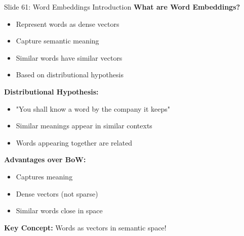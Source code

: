 \documentclass[8pt]{beamer}
\begin{document}
	\begin{frame}{Slide 61: Word Embeddings Introduction}
		\fontsize{6.5}{7.5}\selectfont
		\textbf{What are Word Embeddings?}
		\begin{itemize}
			\item Represent words as dense vectors
			\item Capture semantic meaning
			\item Similar words have similar vectors
			\item Based on distributional hypothesis
		\end{itemize}
		
		\vspace{0.1cm}
		\textbf{Distributional Hypothesis:}
		\begin{itemize}
			\item "You shall know a word by the company it keeps"
			\item Similar meanings appear in similar contexts
			\item Words appearing together are related
		\end{itemize}
		
		\vspace{0.1cm}
		\textbf{Advantages over BoW:}
		\begin{itemize}
			\item Captures meaning
			\item Dense vectors (not sparse)
			\item Similar words close in space
		\end{itemize}
		
		\textcolor{myblue}{\textbf{Key Concept:}} Words as vectors in semantic space!
	\end{frame}
	
\end{document}
